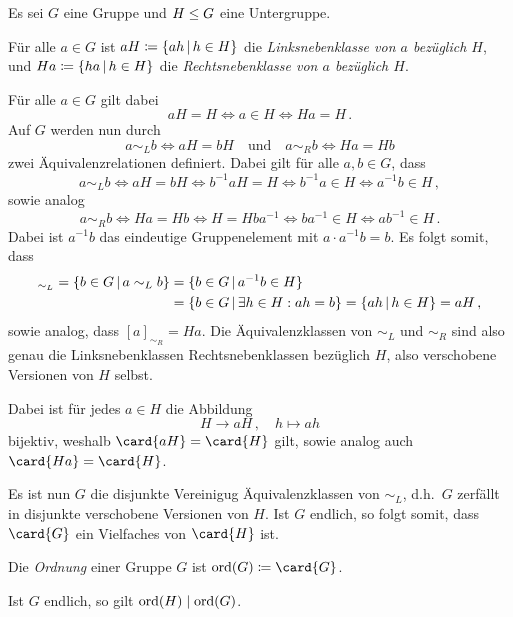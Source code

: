 Es sei $G$ eine Gruppe und $H \mathrel{\leq} G$ eine Untergruppe.

\begin{definition}
  Für alle $a \in G$ ist $aH \defined \{ ah \suchthat h \in H \}$ die \emph{Linksnebenklasse von $a$ bezüglich $H$}, und $Ha \defined \{ ha \suchthat h \in H \}$ die \emph{Rechtsnebenklasse von $a$ bezüglich $H$}.
\end{definition}

Für alle $a \in G$ gilt dabei
\[
        aH = H
  \iff  a \in H
  \iff  Ha = H \,.
\]
Auf $G$ werden nun durch
\[
        a \sim_L b
  \iff  aH = bH
  \quad\text{und}\quad
        a \sim_R b
  \iff  Ha = Hb
\]
zwei Äquivalenzrelationen definiert.
Dabei gilt für alle $a, b \in G$, dass
\[
        a \sim_L b
  \iff  aH = bH
  \iff  b^{-1} a H = H
  \iff  b^{-1} a \in H
  \iff  a^{-1} b \in H \,,
\]
sowie analog
\[
        a \sim_R b
  \iff  Ha = Hb
  \iff  H = H b a^{-1}
  \iff  b a^{-1} \in H
  \iff  a b^{-1} \in H \,.
\]
Dabei ist $a^{-1} b$ das eindeutige Gruppenelement mit $a \cdot a^{-1} b = b$.
Es folgt somit, dass
\begin{align*}
      [a]_{\sim_L}
   =  \{ b \in G \suchthat a \sim_L b \}
  &=  \{ b \in G \suchthat a^{-1} b \in H \}  \\
  &=  \{ b \in G \suchthat \exists h \in H : ah = b \}
   =  \{ ah \suchthat h \in H \}
   =  aH \,,
\end{align*}
sowie analog, dass $[a]_{\sim_R} = Ha$.
Die Äquivalenzklassen von $\sim_L$ und $\sim_R$ sind also genau die Linksnebenklassen Rechtsnebenklassen bezüglich $H$, also verschobene Versionen von $H$ selbst.

Dabei ist für jedes $a \in H$ die Abbildung
\[
          H
  \to     aH \,,
  \quad   h
  \mapsto ah
\]
bijektiv, weshalb $\card{aH} = \card{H}$ gilt, sowie analog auch $\card{Ha} = \card{H}$.

Es ist nun $G$ die disjunkte Vereinigug Äquivalenzklassen von $\sim_L$, d.h.\ $G$ zerfällt in disjunkte verschobene Versionen von $H$.
Ist $G$ endlich, so folgt somit, dass $\card{G}$ ein Vielfaches von $\card{H}$ ist.

\begin{definition}
  Die \emph{Ordnung} einer Gruppe $G$ ist $\ord{G} \defined \card{G}$.
\end{definition}

\begin{corollary}
  Ist $G$ endlich, so gilt $\operatorname{ord}(H) \mathrel{|} \operatorname{ord}(G)$.
\end{corollary}

